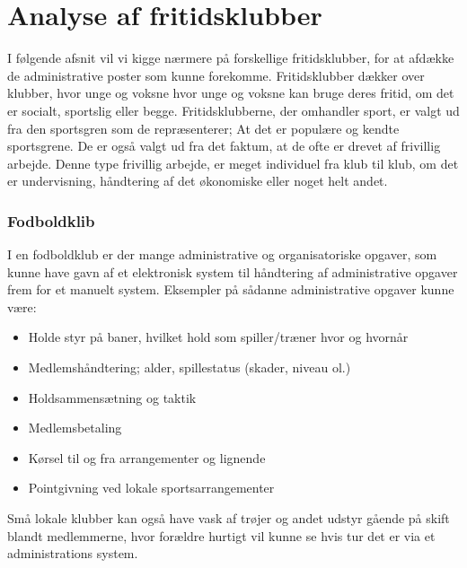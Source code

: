 \chapter{Analyse af fritidsklubber} \label{Fritidsklubber}

I følgende afsnit vil vi kigge nærmere på forskellige fritidsklubber, for at afdække de administrative poster som kunne forekomme. Fritidsklubber dækker over klubber, hvor unge og voksne hvor unge og voksne kan bruge deres fritid, om det er socialt, sportslig eller begge. Fritidsklubberne, der omhandler sport, er valgt ud fra den sportsgren som de repræsenterer; At det er populære og kendte sportsgrene. De er også valgt ud fra det faktum, at de ofte er drevet af frivillig arbejde. Denne type frivillig arbejde, er meget individuel fra klub til klub, om det er undervisning, håndtering af det økonomiske eller noget helt andet. 


\subsection{Fodboldklib} \label{Fodbold}
I en fodboldklub er der mange administrative og organisatoriske opgaver, som kunne have gavn af et elektronisk system
til håndtering af administrative opgaver frem for et manuelt system. Eksempler på sådanne
administrative opgaver kunne være:

\begin{itemize}
\item Holde styr på baner, hvilket hold som spiller/træner hvor og hvornår
\item Medlemshåndtering; alder, spillestatus (skader, niveau ol.)
\item Holdsammensætning og taktik
\item Medlemsbetaling
\item Kørsel til og fra arrangementer og lignende
\item Pointgivning ved lokale sportsarrangementer
\end{itemize}

Små lokale klubber kan også have vask af trøjer og andet udstyr gående på skift blandt medlemmerne, hvor forældre hurtigt vil kunne se hvis tur det er via et administrations system. 


